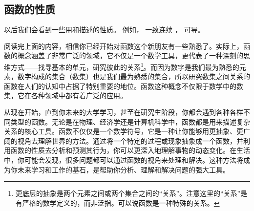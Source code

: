 \subsection{函数的性质}
以后我们会看到一些用和描述的性质。 例如， 一致连续 %
， 可导。

阅读完上面的内容，相信你已经开始对函数这个新朋友有一些熟悉了。实际上，函数的概念涵盖了非常广泛的领域，它不仅是一个数学工具，更代表了一种深刻的思维方式——找寻基本的单元，研究彼此的关系\footnote{更底层的抽象是两个元素之间或两个集合之间的“关系”。注意这里的“关系”是有严格的数学定义的，而非泛指。可以说函数是一种特殊的关系。}。而因为数字是我们最为熟悉的元素，数字构成的集合（数集）也是我们最为熟悉的集合，所以研究数集之间关系的函数在人们的认知中占据了特别重要的地位。函数这种概念不仅限于数学中的数集，它在各种领域中都有着广泛的应用。

从现在开始，直到你未来的大学学习，甚至在研究生阶段，你都会遇到各种各样不同类型的函数。无论是在物理、经济学还是计算机科学中，函数都是用来描述复杂关系的核心工具。函数不仅仅是一个数学符号，它是一种让你能够用更抽象、更广阔的视角去理解世界的方法。通过将一个特定的过程或现象抽象成一个函数，并利用函数的性质去分析和预测其行为，你可以更深入地理解事物的动态变化。在生活中，你可能会发现，很多问题都可以通过函数的视角来处理和解决。这种方法将成为你未来学习和工作的基石，是帮助你分析、理解和解决问题的强大工具。
